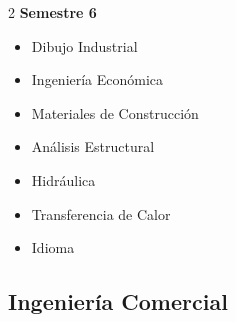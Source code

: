 \documentclass[12pt,a4paper]{article}
\begin{document}
\begin{multicols}{2}
		\textbf{Semestre 6}
		\begin{itemize}
			\item Dibujo Industrial
			\item Ingeniería Económica
			\item Materiales de Construcción
			\item Análisis Estructural
			\item Hidráulica
			\item Transferencia de Calor
			\item Idioma
		\end{itemize}
	\end{multicols}
	
	\newpage
	
	\subsection{Ingeniería Comercial}
	
\end{document}

